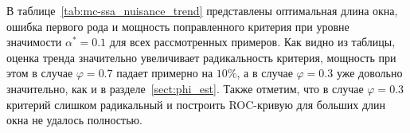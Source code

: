 \documentclass[specialist,
substylefile = spbu_report.rtx,
subf,href,colorlinks=true, 12pt]{disser}
\theoremstyle{definition}
\begin{document}
В таблице~\ref{tab:mc-ssa_nuisance_trend} представлены оптимальная длина окна, ошибка первого рода и мощность поправленного критерия при уровне значимости $\alpha^*=0.1$ для всех рассмотренных примеров. Как видно из таблицы, оценка тренда значительно увеличивает радикальность критерия, мощность при этом в случае $\varphi=0.7$ падает примерно на $10\%$, а в случае $\varphi=0.3$ уже довольно значительно, как и в разделе~\ref{sect:phi_est}. Также отметим, что в случае $\varphi=0.3$ критерий слишком радикальный и построить ROC-кривую для больших длин окна не удалось полностью.

%
%
\end{document}
